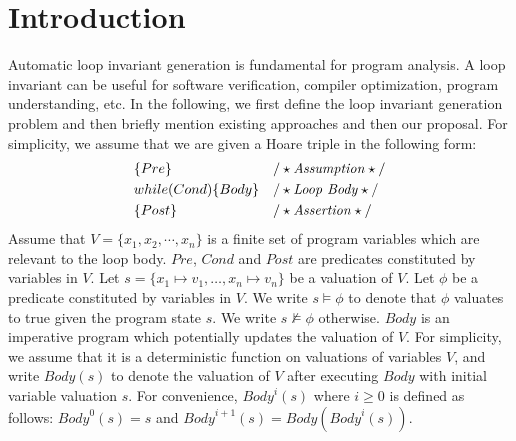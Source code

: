 
\section{Introduction} %
\label{sec:introduction}
Automatic loop invariant generation is fundamental for program analysis. A loop invariant can be useful for software verification, compiler optimization, program understanding, etc. In the following, we first define the loop invariant generation problem and then briefly mention existing approaches and then our proposal. For simplicity, we assume that we are given a Hoare triple in the following form:
\begin{align*}
&\{Pre\} & & /\star\text{\emph{Assumption}}\star/ \\
&while (Cond) \{ Body \} && /\star\text{\emph{Loop Body}}\star/\\
&\{Post\} & & /\star\text{\emph{Assertion}}\star/
\end{align*}
Assume that $V = \{x_1{,} x_2{,} \cdots{,} x_n\}$ is a finite set of program variables which are relevant to the loop body. $Pre$, $Cond$ and $Post$ are predicates constituted by variables in $V$.
Let $s = \{ x_1 \mapsto v_1, \ldots, x_n \mapsto v_n \}$ be a valuation of $V$. Let $\phi$ be a predicate constituted by variables in $V$. We write $s \models \phi$ to denote that $\phi$ valuates to true given the program state $s$. We write $s \not \models \phi$ otherwise.
$\mathit{Body}$ is an imperative program which potentially updates the valuation of $V$. For simplicity, we assume that it is a deterministic function on valuations of variables $V$, and write $\mathit{Body}(s)$ to denote the valuation of $V$ after executing $\mathit{Body}$ with initial variable valuation $s$. For convenience, $\mathit{Body}^i(s)$ where $i \geq 0$ is defined as follows: $\mathit{Body}^0(s) = s$ and $\mathit{Body}^{i+1}(s) = \mathit{Body}(\mathit{Body}^i(s))$.

